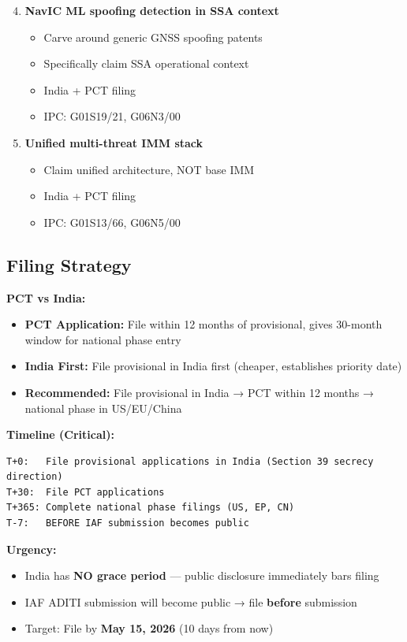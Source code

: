 \documentclass[11pt,a4paper]{article}
\begin{document}
\begin{enumerate}
\setcounter{enumi}{3}
\item \textbf{NavIC ML spoofing detection in SSA context}
  \begin{itemize}
  \item Carve around generic GNSS spoofing patents
  \item Specifically claim SSA operational context
  \item India + PCT filing
  \item IPC: G01S19/21, G06N3/00
  \end{itemize}

\item \textbf{Unified multi-threat IMM stack}
  \begin{itemize}
  \item Claim unified architecture, NOT base IMM
  \item India + PCT filing
  \item IPC: G01S13/66, G06N5/00
  \end{itemize}
\end{enumerate}

\subsection{Filing Strategy}

\textbf{PCT vs India:}
\begin{itemize}
\item \textbf{PCT Application:} File within 12 months of provisional, gives 30-month window for national phase entry
\item \textbf{India First:} File provisional in India first (cheaper, establishes priority date)
\item \textbf{Recommended:} File provisional in India → PCT within 12 months → national phase in US/EU/China
\end{itemize}

\textbf{Timeline (Critical):}
\begin{verbatim}
T+0:   File provisional applications in India (Section 39 secrecy direction)
T+30:  File PCT applications
T+365: Complete national phase filings (US, EP, CN)
T-7:   BEFORE IAF submission becomes public
\end{verbatim}

\textbf{Urgency:}
\begin{itemize}
\item India has \textbf{NO grace period} — public disclosure immediately bars filing
\item IAF ADITI submission will become public → file \textbf{before} submission
\item Target: File by \textbf{May 15, 2026} (10 days from now)
\end{itemize}
\end{document}
